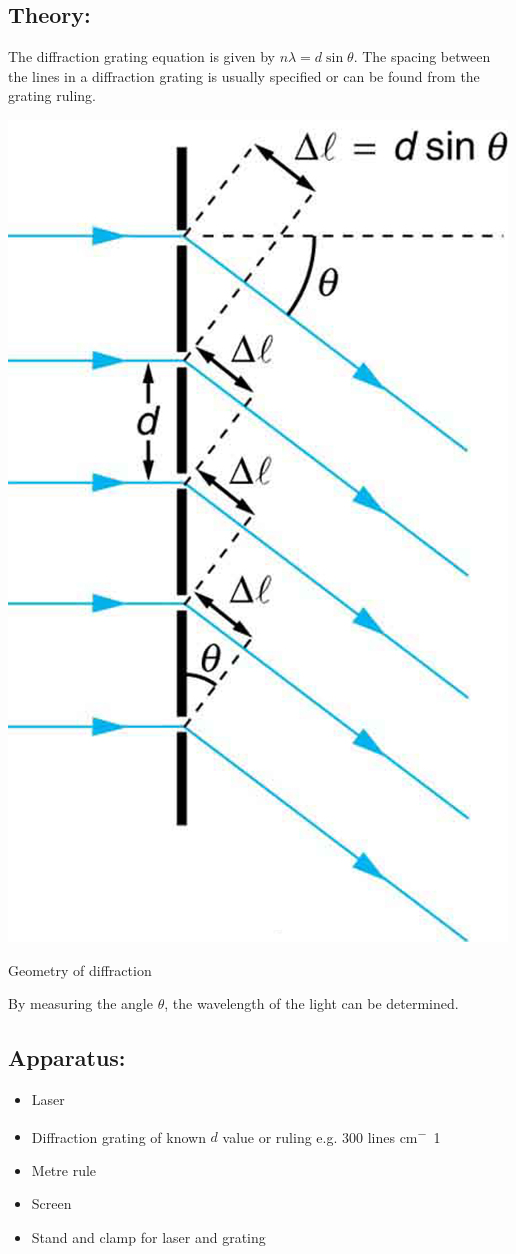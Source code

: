 \documentclass{tufte-handout}
\begin{document}
\subsection{Theory:} 
The diffraction grating equation is given by $n \lambda  =d\sin \theta$. The spacing between the lines in a diffraction grating is usually specified or can be found from the grating ruling.
\begin{marginfigure}
\includegraphics[]{diffraction.jpg}
\caption{Geometry of diffraction}
\end{marginfigure} 
By measuring the angle $\theta$, the wavelength of the light can be determined. 
\subsection{Apparatus:}
\begin{itemize}
\item Laser 
\item Diffraction grating of known $d$ value or ruling e.g. 300 lines \si{cm^-1} 
\item Metre rule 
\item Screen 
\item Stand and clamp for laser and grating 
\end{itemize}
\end{document}
